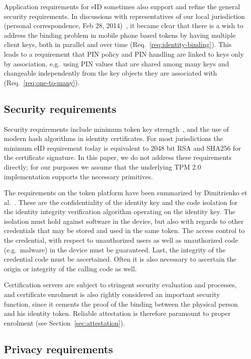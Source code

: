 \documentclass{sig-alternate-2013}
\begin{document}
Application requirements for eID sometimes also support and refine the general
security requirements. In discussions with representatives of our local
jurisdiction (personal correspondence, Feb 28, 2014)~\cite{Laitinen14}, it became
clear that there is a wish to address the binding problem in mobile phone based
tokens by having multiple client keys, both in parallel and over time
(Req.~\ref{req:identity-binding}). This leads to a requirement that PIN policy
and PIN handling are linked to keys only by association, e.g.\ using PIN values
that are shared among many keys and changeable independently from the key
objects they are associated with (Req.~\ref{req:one-to-many}).

\subsection{Security requirements}

Security requirements include minimum token key strength~\cite{Lenstra99}, and
the use of modern hash algorithms in identity certificates. For most
jurisdictions the minimum eID requirement today is equivalent to 2048 bit RSA
and SHA256 for the certificate signature. In this paper, we do not address these
requirements directly; for our purposes we assume that the underlying TPM 2.0
implementation supports the necessary primitives.

The requirements on the token platform have been summarized by Dimitrienko et
al.~\cite{Dmitrienko12}. These are the confidentiality of the identity key and
the code isolation for the identity integrity verification algorithm operating
on the identity key. The isolation must hold against software in the device, but
also with regards to other credentials that may be stored and used in the same
token. The access control to the credential, with respect to unauthorized users
as well as unauthorized code (e.g.\ malware) in the device must be guaranteed.
Last, the integrity of the credential code must be ascertained. Often it is also
necessary to ascertain the origin or integrity of the calling code as well.

Certification servers are subject to stringent security evaluation and
processes, and certificate enrolment is also rightly considered an important
security function, since it cements the proof of the binding between the
physical person and his identity token. Reliable attestation is therefore
paramount to proper enrolment (see Section~\ref{sec:attestation}).

\subsection{Privacy requirements}
\end{document}
